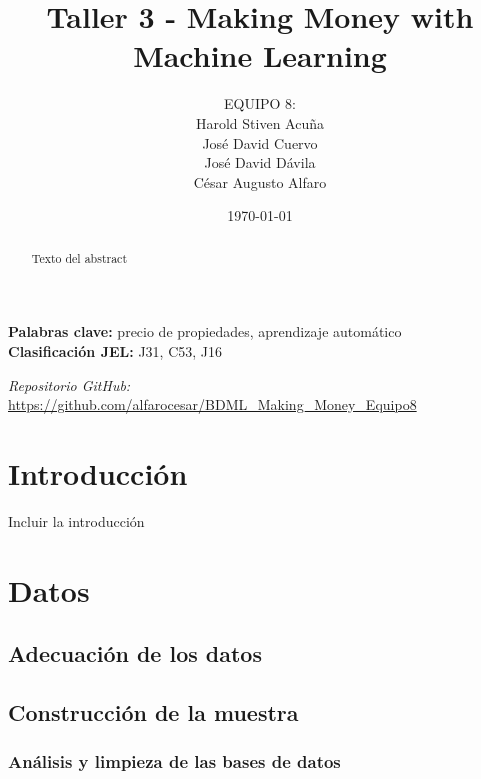 \documentclass[12pt,a4paper,onecolumn]{article}
\title{\textbf{Taller 3 - Making Money with Machine Learning}}
\author{%
\begin{center}
EQUIPO 8:\\
Harold Stiven Acuña\\
José David Cuervo\\
José David Dávila\\
César Augusto Alfaro
\end{center}%
}
\date{\today}
\begin{document}
\maketitle
\thispagestyle{empty}


\begin{abstract}
Texto del abstract
\end{abstract}

\medskip

\begin{flushleft}
    {\bf Palabras clave:} precio de propiedades, aprendizaje automático \\
    {\bf Clasificación JEL:} J31, C53, J16
\end{flushleft}

\begin{center}
    \textit{Repositorio GitHub:} \url{https://github.com/alfarocesar/BDML_Making_Money_Equipo8}
\end{center}

\pagebreak
\singlespacing
\setlength{\parindent}{0pt}
\setlength{\parskip}{1em}


\section{Introducción}

Incluir la introducción

\section{Datos}

\subsection{Adecuación de los datos}

\subsection{Construcción de la muestra}

\subsubsection{Análisis y limpieza de las bases de datos}
\end{document}
